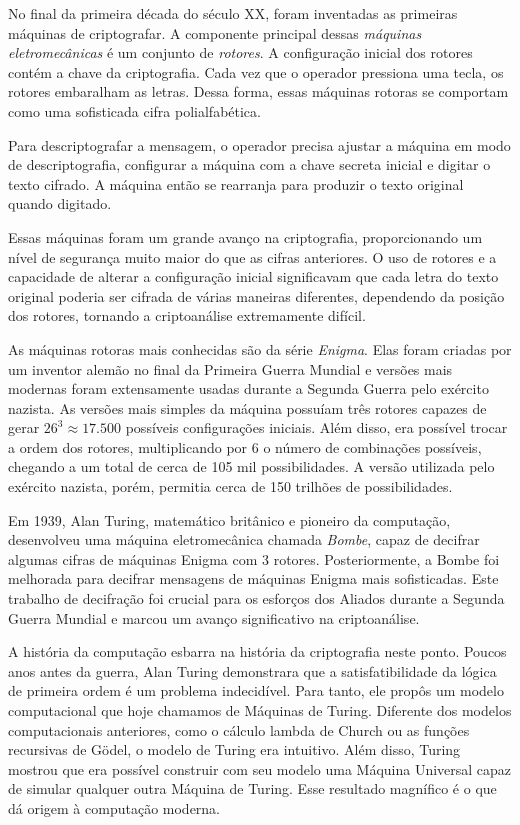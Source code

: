 No final da primeira década do século XX, foram inventadas as primeiras máquinas de criptografar.
A componente principal dessas {\em máquinas eletromecânicas} é um conjunto de {\em rotores}.
A configuração inicial dos rotores contém a chave da criptografia.
Cada vez que o operador pressiona uma tecla, os rotores embaralham as letras.
Dessa forma, essas máquinas rotoras se comportam como uma sofisticada cifra polialfabética.

Para descriptografar a mensagem, o operador precisa ajustar a máquina em modo de descriptografia, configurar a máquina com a chave secreta inicial e digitar o texto cifrado.
A máquina então se rearranja para produzir o texto original quando digitado.

Essas máquinas foram um grande avanço na criptografia, proporcionando um nível de segurança muito maior do que as cifras anteriores.
O uso de rotores e a capacidade de alterar a configuração inicial significavam que cada letra do texto original poderia ser cifrada de várias maneiras diferentes, dependendo da posição dos rotores, tornando a criptoanálise extremamente difícil.

As máquinas rotoras mais conhecidas são da série {\em Enigma}.
Elas foram criadas por um inventor alemão no final da Primeira Guerra Mundial e versões mais modernas foram extensamente usadas durante a Segunda Guerra pelo exército nazista.
As versões mais simples da máquina possuíam três rotores capazes de gerar $26^3 \approx 17.500$ possíveis configurações iniciais.
Além disso, era possível trocar a ordem dos rotores, multiplicando por 6 o número de combinações possíveis, chegando a um total de cerca de 105 mil possibilidades.
A versão utilizada pelo exército nazista, porém, permitia cerca de 150 trilhões de possibilidades.

Em 1939, Alan Turing, matemático britânico e pioneiro da computação, desenvolveu uma máquina eletromecânica chamada {\em Bombe}, capaz de decifrar algumas cifras de máquinas Enigma com 3 rotores.
Posteriormente, a Bombe foi melhorada para decifrar mensagens de máquinas Enigma mais sofisticadas.
Este trabalho de decifração foi crucial para os esforços dos Aliados durante a Segunda Guerra Mundial e marcou um avanço significativo na criptoanálise.

A história da computação esbarra na história da criptografia neste ponto.
Poucos anos antes da guerra, Alan Turing demonstrara que a satisfatibilidade da lógica de primeira ordem é um problema indecidível.
Para tanto, ele propôs um modelo computacional que hoje chamamos de Máquinas de Turing.
Diferente dos modelos computacionais anteriores, como o cálculo lambda de Church ou as funções recursivas de Gödel, o modelo de Turing era intuitivo.
Além disso, Turing mostrou que era possível construir com seu modelo uma Máquina Universal capaz de simular qualquer outra Máquina de Turing.
Esse resultado magnífico é o que dá origem à computação moderna.


